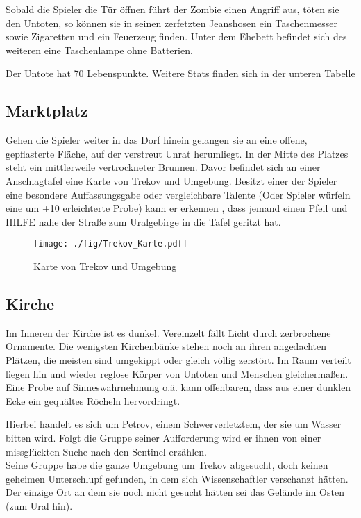 \documentclass{include/protokollclass}
\newcommand{\gqm}[1]{\glqq#1\grqq}
\begin{document}
Sobald die Spieler die Tür öffnen führt der Zombie einen Angriff aus, töten sie den Untoten, so können sie in seinen zerfetzten Jeanshosen ein Taschenmesser sowie Zigaretten und ein Feuerzeug finden.
Unter dem Ehebett befindet sich des weiteren eine Taschenlampe ohne Batterien.

Der Untote hat 70 Lebenspunkte. Weitere Stats finden sich in der unteren Tabelle

\begin{center}
  
\end{center}


\subsection{Marktplatz}

Gehen die Spieler weiter in das Dorf hinein gelangen sie an eine offene, gepflasterte Fläche, auf der verstreut Unrat herumliegt.
In der Mitte des Platzes steht ein mittlerweile vertrockneter Brunnen. Davor befindet sich an einer Anschlagtafel eine Karte von Trekov und Umgebung.
Besitzt einer der Spieler eine besondere Auffassungsgabe oder vergleichbare Talente (Oder Spieler würfeln eine um +10 erleichterte Probe) kann er erkennen , dass jemand einen Pfeil und \gqm{HILFE} nahe der Straße zum Uralgebirge in die Tafel geritzt hat.

\begin{figure}[ht]
	\begin{center}
		\texttt{[image: ./fig/Trekov\_Karte.pdf]}
		\caption{Karte von Trekov und Umgebung}
	\end{center}
\end{figure}

\subsection{Kirche}

Im Inneren der Kirche ist es dunkel. Vereinzelt fällt Licht durch zerbrochene Ornamente. Die wenigsten Kirchenbänke stehen noch an ihren angedachten Plätzen, die meisten sind umgekippt oder gleich völlig zerstört. Im Raum verteilt liegen hin und wieder reglose Körper von Untoten und Menschen gleichermaßen.
Eine Probe auf Sinneswahrnehmung o.ä. kann offenbaren, dass aus einer dunklen Ecke ein gequältes Röcheln hervordringt.

Hierbei handelt es sich um Petrov, einem Schwerverletztem, der sie um Wasser bitten wird. Folgt die Gruppe seiner Aufforderung wird er ihnen von einer missglückten Suche nach den Sentinel erzählen.
\\Seine Gruppe habe die ganze Umgebung um Trekov abgesucht, doch keinen geheimen Unterschlupf gefunden, in dem sich Wissenschaftler verschanzt hätten. Der einzige Ort an dem sie noch nicht gesucht hätten sei das Gelände im Osten (zum Ural hin).
\end{document}

